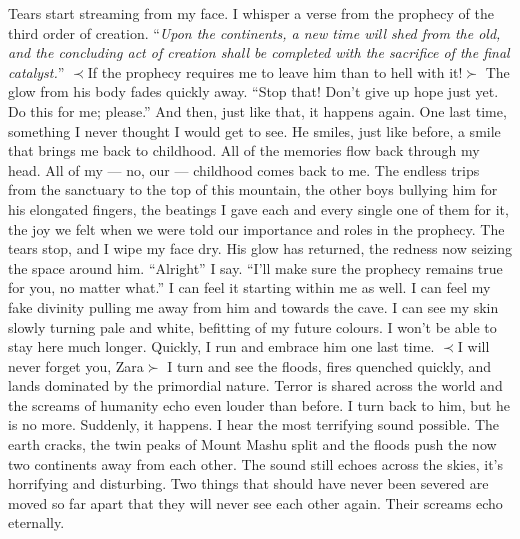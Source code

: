 \documentclass[openany, 12pt]{book}
\newcommand\tab[1][1cm]{\hspace*{#1}}
\begin{document}
\newline
\tab
Tears start streaming from my face. I whisper a verse from the prophecy of the third order of creation. ``\textit{Upon the continents, a new time will shed from the old, and the concluding act of creation shall be completed with the sacrifice of the final catalyst.}''
\newline
$\prec$If the prophecy requires me to leave him than to hell with it!$\succ$
\newline
\tab
The glow from his body fades quickly away. ``Stop that! Don't give up hope just yet. Do this for me; please.'' And then, just like that, it happens again. One last time, something I never thought I would get to see. He smiles, just like before, a smile that brings me back to childhood.
\newline
\tab
All of the memories flow back through my head. All of my --- no, our --- childhood comes back to me. The endless trips from the sanctuary to the top of this mountain, the other boys bullying him for his elongated fingers, the beatings I gave each and every single one of them for it, the joy we felt when we were told our importance and roles in the prophecy.
\newline
\tab
The tears stop, and I wipe my face dry. His glow has returned, the redness now seizing the space around him.
\newline
\tab
``Alright'' I say. ``I'll make sure the prophecy remains true for you, no matter what.''
\newline
\tab
I can feel it starting within me as well. I can feel my fake divinity pulling me away from him and towards the cave. I can see my skin slowly turning pale and white, befitting of my future colours. I won't be able to stay here much longer. Quickly, I run and embrace him one last time.
\newline
$\prec$I will never forget you, Zara$\succ$
\newline
\tab
I turn and see the floods, fires quenched quickly, and lands dominated by the primordial nature. Terror is shared across the world and the screams of humanity echo even louder than before. I turn back to him, but he is no more. Suddenly, it happens. I hear the most terrifying sound possible. The earth cracks, the twin peaks of Mount Mashu split and the floods push the now two continents away from each other. The sound still echoes across the skies, it's horrifying and disturbing. Two things that should have never been severed are moved so far apart that they will never see each other again. Their screams echo eternally.
\end{document}
